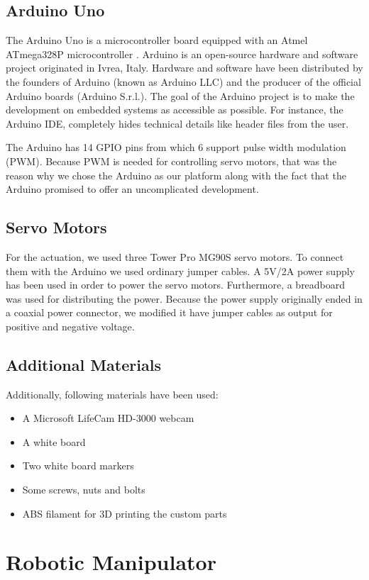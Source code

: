 \documentclass{sig-alternate-05-2015}
\begin{document}
\subsection{Arduino Uno}
The Arduino Uno is a microcontroller board equipped with an Atmel ATmega328P microcontroller \cite{Atm}. Arduino is an open-source hardware and software project originated in Ivrea, Italy\cite{Ard}. Hardware and software have been distributed by the founders of Arduino (known as Arduino LLC) and the producer of the official Arduino boards (Arduino S.r.l.). The goal of the Arduino project is to make the development on embedded systems as accessible as possible. For instance, the Arduino IDE, completely hides technical details like header files from the user.

The Arduino has 14 GPIO pins from which 6 support pulse width modulation (PWM). Because PWM is needed for controlling servo motors, that was the reason why we chose the Arduino as our platform along with the fact that the Arduino promised to offer an uncomplicated development.

\subsection{Servo Motors}
For the actuation, we used three Tower Pro MG90S servo motors\cite{Ser}. To connect them with the Arduino we used ordinary jumper cables. A 5V/2A power supply has been used in order to power the servo motors. Furthermore, a breadboard was used for distributing the power. Because the power supply originally ended in a coaxial power connector, we modified it have jumper cables as output for positive and negative voltage.

\subsection{Additional Materials}
Additionally, following materials have been used:
\begin{itemize}
	\item A Microsoft LifeCam HD-3000 webcam
	\item A white board
	\item Two white board markers
	\item Some screws, nuts and bolts
	\item ABS filament for 3D printing the custom parts
\end{itemize}

\section{Robotic Manipulator}
\end{document}
